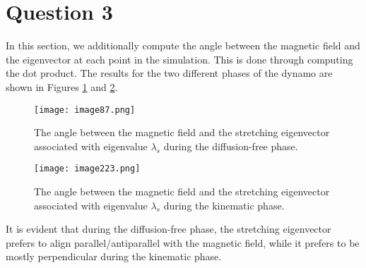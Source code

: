 \documentclass{article}
\begin{document}
\section*{Question 3}
In this section, we additionally compute the angle between the magnetic field and the eigenvector at each point in the simulation. This is done through computing the dot product. The results for the two different phases of the dynamo are shown in Figures \ref{fig:diff-free} and \ref{fig:kinematic}.

\begin{figure}[H]
    \centering
    \texttt{[image: image87.png]}
    \caption{The angle between the magnetic field and the stretching eigenvector associated with eigenvalue $\lambda_s$ during the diffusion-free phase.}
    \label{fig:diff-free}
\end{figure}
\begin{figure}[H]
    \centering
    \texttt{[image: image223.png]}
    \caption{The angle between the magnetic field and the stretching eigenvector associated with eigenvalue $\lambda_s$ during the kinematic phase.}
    \label{fig:kinematic}
\end{figure}
It is evident that during the diffusion-free phase, the stretching eigenvector prefers to align parallel/antiparallel with the magnetic field, while it prefers to be mostly perpendicular during the kinematic phase. 
\end{document}
